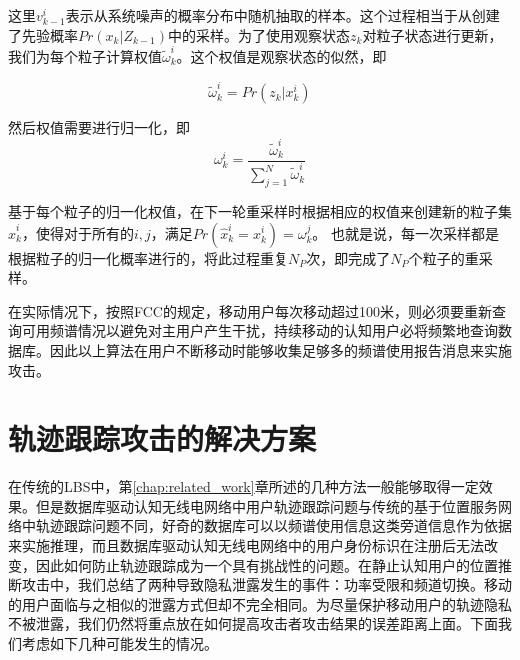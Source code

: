 这里$v_{k-1}^{i}$表示从系统噪声的概率分布中随机抽取的样本。这个过程相当于从创建了先验概率$Pr(x_{k}|Z_{k-1})$中的采样。为了使用观察状态$z_{k}$对粒子状态进行更新，我们为每个粒子计算权值$\tilde{\omega}_{k}^{i}$。这个权值是观察状态的似然，即

\begin{equation}
\tilde{\omega}_{k}^{i} = Pr(z_{k}|x_{k}^{i})
\end{equation}

然后权值需要进行归一化，即
\begin{equation}
\omega_{k}^{i} = \frac{\tilde{\omega}_{k}^{i}}{\sum_{j=1}^{N}\tilde{\omega}_{k}^{i}}
\end{equation}

基于每个粒子的归一化权值，在下一轮重采样时根据相应的权值来创建新的粒子集$\hat{x}_{k}^{i}$，使得对于所有的$i,j$，满足$Pr(\hat{x}_{k}^{i} = x_{k}^{i}) = \omega_{k}^{j}$。
也就是说，每一次采样都是根据粒子的归一化概率进行的，将此过程重复$N_{P}$次，即完成了$N_{P}$个粒子的重采样。

在实际情况下，按照FCC的规定，移动用户每次移动超过100米，则必须要重新查询可用频谱情况以避免对主用户产生干扰，持续移动的认知用户必将频繁地查询数据库。因此以上算法在用户不断移动时能够收集足够多的频谱使用报告消息来实施攻击。

\section{轨迹跟踪攻击的解决方案}

在传统的LBS中，第\ref{chap:related_work}章所述的几种方法一般能够取得一定效果。但是数据库驱动认知无线电网络中用户轨迹跟踪问题与传统的基于位置服务网络中轨迹跟踪问题不同，好奇的数据库可以以频谱使用信息这类旁道信息作为依据来实施推理，而且数据库驱动认知无线电网络中的用户身份标识在注册后无法改变，因此如何防止轨迹跟踪成为一个具有挑战性的问题。在静止认知用户的位置推断攻击中，我们总结了两种导致隐私泄露发生的事件：功率受限和频道切换。移动的用户面临与之相似的泄露方式但却不完全相同。为尽量保护移动用户的轨迹隐私不被泄露，我们仍然将重点放在如何提高攻击者攻击结果的误差距离上面。下面我们考虑如下几种可能发生的情况。

